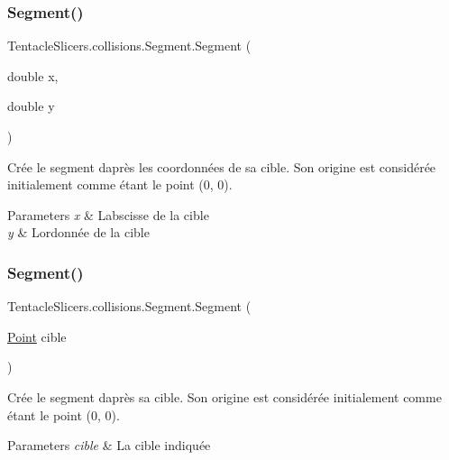 \subsubsection{\texorpdfstring{Segment()}{Segment()}\hspace{0.1cm}{\footnotesize\ttfamily [1/2]}}
{\footnotesize\ttfamily Tentacle\+Slicers.\+collisions.\+Segment.\+Segment (\begin{DoxyParamCaption}\item[{double}]{x,  }\item[{double}]{y }\end{DoxyParamCaption})}



Crée le segment d\textquotesingle{}après les coordonnées de sa cible. Son origine est considérée initialement comme étant le point (0, 0). 


\begin{DoxyParams}{Parameters}
{\em x} & L\textquotesingle{}abscisse de la cible \\
\hline
{\em y} & L\textquotesingle{}ordonnée de la cible \\
\hline
\end{DoxyParams}
\mbox{\label{class_tentacle_slicers_1_1collisions_1_1_segment_a24beaff9e89a6b3fd54b59f16a9edb4b}} 
\subsubsection{\texorpdfstring{Segment()}{Segment()}\hspace{0.1cm}{\footnotesize\ttfamily [2/2]}}
{\footnotesize\ttfamily Tentacle\+Slicers.\+collisions.\+Segment.\+Segment (\begin{DoxyParamCaption}\item[{\hyperlink{class_tentacle_slicers_1_1general_1_1_point}{Point}}]{cible }\end{DoxyParamCaption})}



Crée le segment d\textquotesingle{}après sa cible. Son origine est considérée initialement comme étant le point (0, 0). 


\begin{DoxyParams}{Parameters}
{\em cible} & La cible indiquée \\
\hline
\end{DoxyParams}


